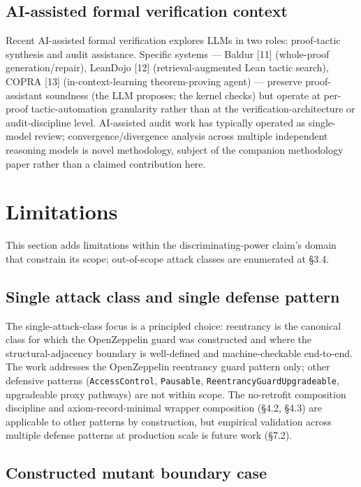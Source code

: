\subsection{AI-assisted formal verification
context}\label{ai-assisted-formal-verification-context}

Recent AI-assisted formal verification explores LLMs in two roles:
proof-tactic synthesis and audit assistance. Specific systems --- Baldur
{[}11{]} (whole-proof generation/repair), LeanDojo {[}12{]}
(retrieval-augmented Lean tactic search), COPRA {[}13{]}
(in-context-learning theorem-proving agent) --- preserve proof-assistant
soundness (the LLM proposes; the kernel checks) but operate at per-proof
tactic-automation granularity rather than at the
verification-architecture or audit-discipline level. AI-assisted audit
work has typically operated as single-model review;
convergence/divergence analysis across multiple independent reasoning
models is novel methodology, subject of the companion methodology paper
rather than a claimed contribution here.

\section{Limitations}\label{limitations}

This section adds limitations within the discriminating-power claim's
domain that constrain its scope; out-of-scope attack classes are
enumerated at §3.4.

\subsection{Single attack class and single defense
pattern}\label{single-attack-class-and-single-defense-pattern}

The single-attack-class focus is a principled choice: reentrancy is the
canonical class for which the OpenZeppelin guard was constructed and
where the structural-adjacency boundary is well-defined and
machine-checkable end-to-end. The work addresses the OpenZeppelin
reentrancy guard pattern only; other defensive patterns
(\texttt{AccessControl}, \texttt{Pausable},
\texttt{ReentrancyGuardUpgradeable}, upgradeable proxy pathways) are not
within scope. The no-retrofit composition discipline and
axiom-record-minimal wrapper composition (§4.2, §4.3) are applicable to
other patterns by construction, but empirical validation across multiple
defense patterns at production scale is future work (§7.2).

\subsection{Constructed mutant boundary
case}\label{constructed-mutant-boundary-case}

